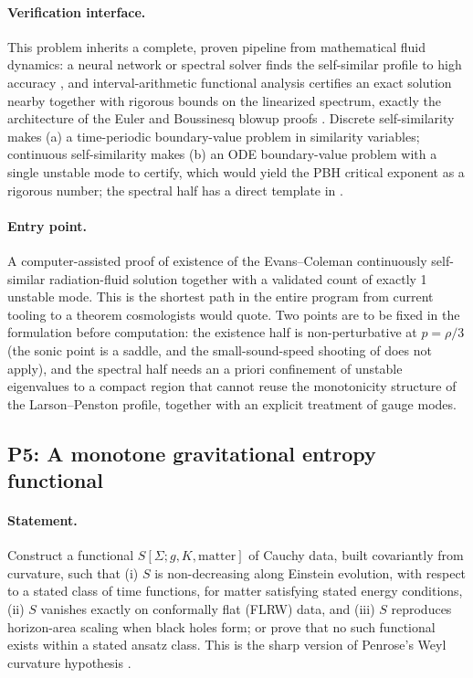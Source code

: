 \documentclass[11pt,letterpaper]{article}
\begin{document}
\paragraph{Verification interface.} This problem inherits a complete, proven pipeline from mathematical fluid dynamics: a neural network or spectral solver finds the self-similar profile to high accuracy \cite{wang2023}, and interval-arithmetic functional analysis certifies an exact solution nearby together with rigorous bounds on the linearized spectrum, exactly the architecture of the Euler and Boussinesq blowup proofs \cite{chenhou2022,gomezserrano2019}. Discrete self-similarity makes (a) a time-periodic boundary-value problem in similarity variables; continuous self-similarity makes (b) an ODE boundary-value problem with a single unstable mode to certify, which would yield the PBH critical exponent as a rigorous number; the spectral half has a direct template in \cite{ghjs2025}.

\paragraph{Entry point.} A computer-assisted proof of existence of the Evans--Coleman continuously self-similar radiation-fluid solution together with a validated count of exactly 1 unstable mode. This is the shortest path in the entire program from current tooling to a theorem cosmologists would quote. Two points are to be fixed in the formulation before computation: the existence half is non-perturbative at $p=\rho/3$ (the sonic point is a saddle, and the small-sound-speed shooting of \cite{ghj2023} does not apply), and the spectral half needs an a priori confinement of unstable eigenvalues to a compact region that cannot reuse the monotonicity structure of the Larson--Penston profile, together with an explicit treatment of gauge modes.

\subsection{P5: A monotone gravitational entropy functional}
\label{sec:p5}

\paragraph{Statement.} Construct a functional $S[\Sigma;g,K,\text{matter}]$ of Cauchy data, built covariantly from curvature, such that (i) $S$ is non-decreasing along Einstein evolution, with respect to a stated class of time functions, for matter satisfying stated energy conditions, (ii) $S$ vanishes exactly on conformally flat (FLRW) data, and (iii) $S$ reproduces horizon-area scaling when black holes form; or prove that no such functional exists within a stated ansatz class. This is the sharp version of Penrose's Weyl curvature hypothesis \cite{penrose1979}.
\end{document}
